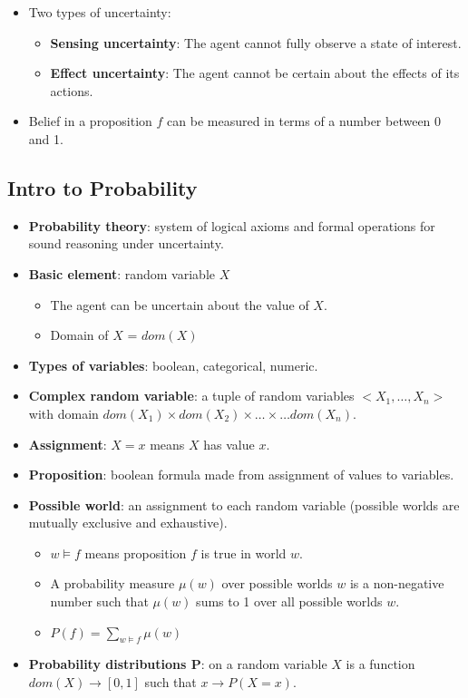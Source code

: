 \documentclass{article}
\begin{document}
\begin{itemize}
    \item Two types of uncertainty:
        \begin{itemize}
            \item \textbf{Sensing uncertainty}: The agent cannot fully observe a state of interest.
            \item \textbf{Effect uncertainty}: The agent cannot be certain about the effects of its actions.
        \end{itemize}
    \item Belief in a proposition $f$ can be measured in terms of a number between 0 and 1.
\end{itemize}

\subsection{Intro to Probability}

\begin{itemize}
    \item \textbf{Probability theory}: system of logical axioms and formal operations for sound reasoning under uncertainty.
    \item \textbf{Basic element}: random variable $X$
        \begin{itemize}
            \item The agent can be uncertain about the value of $X$.
            \item Domain of $X$ = $dom(X)$
        \end{itemize}
    \item \textbf{Types of variables}: boolean, categorical,
    numeric.
    \item \textbf{Complex random variable}: a tuple of random variables $<X_1, \ldots, X_n>$ with domain $dom(X_1) \times dom(X_2) \times \ldots \times \ldots dom(X_n)$.
    \item \textbf{Assignment}: $X = x$ means $X$ has value $x$.
    \item \textbf{Proposition}: boolean formula made from assignment of values to variables.
    \item \textbf{Possible world}: an assignment to each random variable (possible worlds are mutually exclusive and exhaustive).
        \begin{itemize}
            \item $w \vDash f$ means proposition $f$ is true in world $w$.
            \item A probability measure $\mu(w)$ over possible worlds $w$ is a non-negative number such that $\mu(w)$ sums to 1 over all possible worlds $w$.
            \item $P(f) = \sum_{w \vDash f} \mu(w)$
        \end{itemize}
    \item \textbf{Probability distributions P}: on a random variable $X$ is a function $dom(X) \rightarrow [0, 1]$ such that $x \rightarrow P(X = x)$.
\end{itemize}
\end{document}
